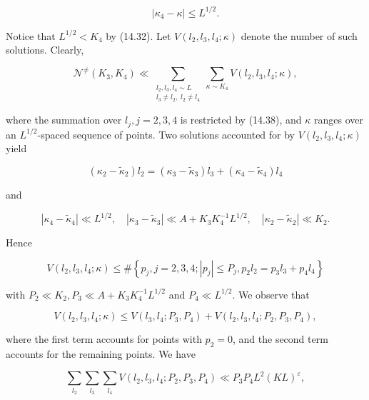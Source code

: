 \documentclass[10pt]{article}
\begin{document}
\begin{equation*}
\left|\kappa_{4}-\kappa\right| \leqslant L^{1 / 2} . \tag{14.39}
\end{equation*}


Notice that $L^{1 / 2}<K_{4}$ by (14.32). Let $V\left(l_{2}, l_{3}, l_{4} ; \kappa\right)$ denote the number of such solutions. Clearly,


\begin{equation*}
\mathscr{N}^{\neq}\left(K_{3}, K_{4}\right) \ll \sum_{\substack{l_{2},l_{3},l_{4} \sim L\\ l_{3}\neq l_{2},\; l_{2}\neq l_{4}}} \sum_{\kappa \sim K_{4}} V\left(l_{2}, l_{3}, l_{4} ; \kappa\right), \tag{14.40}
\end{equation*}


where the summation over $l_{j}, j=2,3,4$ is restricted by (14.38), and $\kappa$ ranges over an $L^{1 / 2}$-spaced sequence of points. Two solutions accounted for by $V\left(l_{2}, l_{3}, l_{4} ; \kappa\right)$ yield

$$
\left(\kappa_{2}-\widetilde{\kappa}_{2}\right) l_{2}=\left(\kappa_{3}-\widetilde{\kappa}_{3}\right) l_{3}+\left(\kappa_{4}-\widetilde{\kappa}_{4}\right) l_{4}
$$

and

$$
\left|\kappa_{4}-\widetilde{\kappa}_{4}\right| \ll L^{1 / 2}, \quad\left|\kappa_{3}-\widetilde{\kappa}_{3}\right|\ll A+K_{3} K_{4}^{-1} L^{1 / 2}, \quad\left|\kappa_{2}-\widetilde{\kappa}_{2}\right| \ll K_{2} .
$$

Hence

$$
V\left(l_{2}, l_{3}, l_{4} ; \kappa\right) \leqslant \#\left\{p_{j}, j=2,3,4 ;\left|p_{j}\right| \leqslant P_{j}, p_{2} l_{2}=p_{3} l_{3}+p_{4} l_{4}\right\}
$$

with $P_{2} \ll K_{2}, P_{3} \ll A+K_{3} K_{4}^{-1} L^{1 / 2}$ and $P_{4} \ll L^{1 / 2}$. We observe that


\begin{equation*}
V\left(l_{2}, l_{3}, l_{4} ; \kappa\right) \leqslant V\left(l_{3}, l_{4} ; P_{3}, P_{4}\right)+V\left(l_{2}, l_{3}, l_{4} ; P_{2}, P_{3}, P_{4}\right), \tag{14.41}
\end{equation*}


where the first term accounts for points with $p_{2}=0$, and the second term accounts for the remaining points. We have


\begin{equation*}
\sum_{l_{2}} \sum_{l_{3}} \sum_{l_{4}} V\left(l_{2}, l_{3}, l_{4} ; P_{2}, P_{3}, P_{4}\right) \ll P_{3} P_{4} L^{2}(K L)^{\varepsilon}, \tag{14.42}
\end{equation*}
\end{document}
